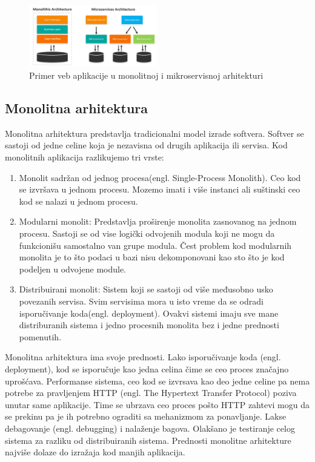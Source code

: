 \documentclass[12pt,oneside]{memoir}
\begin{document}
\begin{figure}[!ht]
  \centering
  \includegraphics[width=0.5\textwidth]{Slika 6.jpg}
  \caption{Primer veb aplikacije u monolitnoj i mikroservisnoj arhitekturi}
  \label{fig:arhitekturniProjektniUzorci}
\end{figure}

\subsection{Monolitna arhitektura}
Monolitna arhitektura predstavlja tradicionalni model izrade softvera. Softver se sastoji od jedne celine koja je nezavisna od drugih aplikacija ili servisa. Kod monolitnih aplikacija razlikujemo tri vrste\cite{bm}:
\begin{enumerate}
  \item Monolit sadržan od jednog procesa(engl. Single-Process Monolith). Ceo kod se izvršava u jednom procesu. Mozemo imati i više instanci ali suštinski ceo kod se nalazi u jednom procesu. 
  \item Modularni monolit: Predstavlja proširenje monolita zasnovanog na jednom procesu. Sastoji se od vise logički odvojenih modula koji ne mogu da funkcionišu samostalno van grupe modula. Čest problem kod modularnih monolita je to što podaci u bazi nisu dekomponovani kao sto što je kod podeljen u odvojene module.
  \item Distribuirani monolit: Sistem koji se sastoji od više međusobno usko povezanih servisa. Svim servisima mora u isto vreme da se odradi isporučivanje koda(engl. deployment). Ovakvi sistemi imaju sve mane distriburanih sistema i jedno procesnih monolita bez i jedne prednosti pomenutih. 
\end{enumerate}
 
Monolitna arhitektura ima svoje prednosti. Lako isporučivanje koda (engl. deployment), kod se isporučuje kao jedna celina čime se ceo proces značajno uprošćava. Performanse sistema, ceo kod se izvrsava kao deo jedne celine pa nema potrebe za pravljenjem HTTP (engl. The Hypertext Transfer Protocol) poziva unutar same aplikacije. Time se ubrzava ceo proces pošto HTTP zahtevi mogu da se prekinu pa je ih potrebno ograditi sa mehanizmom za ponavljanje. Lakse debagovanje (engl. debugging) i nalaženje bagova. Olakšano je testiranje celog sistema za razliku od distribuiranih sistema. Prednosti monolitne arhitekture najviše dolaze do izražaja kod manjih aplikacija\cite{bm}.
 
\end{document}
